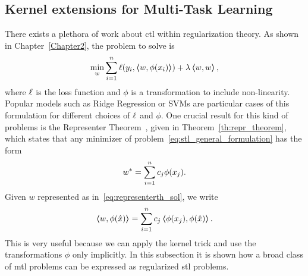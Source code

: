 \subsection{Kernel extensions for Multi-Task Learning} \label{subsec:kernels_mtl}
There exists a plethora of work about \acrfull{ctl} within regularization theory. As shown in Chapter~\ref{Chapter2}, the problem to solve is
\begin{equation}
    \label{eq:stl_general_formulation}
    \begin{aligned}
        \min_{w} & \sum_{i=1}^{\nsamples} \lossf(y_i, \dotp{w}{\phi(x_i)}) + \lambda \dotp{w}{w} , \\
    \end{aligned}
\end{equation}
where $\ell$ is the loss function and $\phi$ is a transformation to include non-linearity. Popular models such as Ridge Regression or SVMs are particular cases of this formulation for different choices of $\ell$ and $\phi$.
One crucial result for this kind of problems is the {Representer Theorem}~\citep{ScholkopfHS01}, given in Theorem~\ref{th:repr_theorem}, which states that any minimizer of problem~\eqref{eq:stl_general_formulation} has the form
\begin{equation}
    \label{eq:representerth_sol}
    \opt{w} = \sum_{i=1}^\nsamples c_j \phi(x_j) .
\end{equation}
Given $w$ represented as in~\eqref{eq:representerth_sol}, we write
\begin{equation}
    \nonumber
    \bm{\left\langle} w, \phi(\hat{x}) \bm{\right\rangle} = \sum_{i=1}^n c_j \bm{\left\langle} \phi(x_j), \phi(\hat{x}) \bm{\right\rangle}.
\end{equation}
This is very useful because we can apply the kernel trick and use the transformations $\phi$ only implicitly.
In this subsection it is shown how a broad class of \acrshort{mtl} problems can be expressed as regularized \acrfull{stl} problems.


